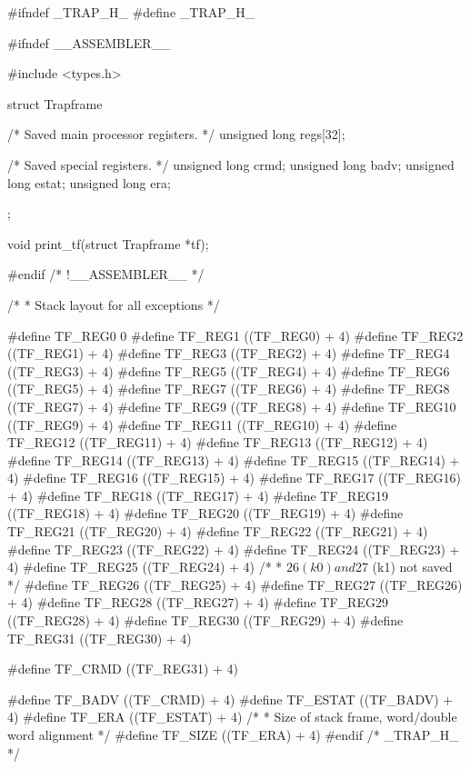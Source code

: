 \begin{CodeBlock}[language=BookC]
#ifndef _TRAP_H_
#define _TRAP_H_

#ifndef __ASSEMBLER__

#include <types.h>

struct Trapframe {
    /* Saved main processor registers. */
    unsigned long regs[32];

    /* Saved special registers. */
    unsigned long crmd;
    unsigned long badv;
    unsigned long estat;
    unsigned long era;
};

void print_tf(struct Trapframe *tf);

#endif /* !__ASSEMBLER__ */

/*
 * Stack layout for all exceptions
 */

#define TF_REG0 0
#define TF_REG1 ((TF_REG0) + 4)
#define TF_REG2 ((TF_REG1) + 4)
#define TF_REG3 ((TF_REG2) + 4)
#define TF_REG4 ((TF_REG3) + 4)
#define TF_REG5 ((TF_REG4) + 4)
#define TF_REG6 ((TF_REG5) + 4)
#define TF_REG7 ((TF_REG6) + 4)
#define TF_REG8 ((TF_REG7) + 4)
#define TF_REG9 ((TF_REG8) + 4)
#define TF_REG10 ((TF_REG9) + 4)
#define TF_REG11 ((TF_REG10) + 4)
#define TF_REG12 ((TF_REG11) + 4)
#define TF_REG13 ((TF_REG12) + 4)
#define TF_REG14 ((TF_REG13) + 4)
#define TF_REG15 ((TF_REG14) + 4)
#define TF_REG16 ((TF_REG15) + 4)
#define TF_REG17 ((TF_REG16) + 4)
#define TF_REG18 ((TF_REG17) + 4)
#define TF_REG19 ((TF_REG18) + 4)
#define TF_REG20 ((TF_REG19) + 4)
#define TF_REG21 ((TF_REG20) + 4)
#define TF_REG22 ((TF_REG21) + 4)
#define TF_REG23 ((TF_REG22) + 4)
#define TF_REG24 ((TF_REG23) + 4)
#define TF_REG25 ((TF_REG24) + 4)
/*
 * $26 (k0) and $27 (k1) not saved
 */
#define TF_REG26 ((TF_REG25) + 4)
#define TF_REG27 ((TF_REG26) + 4)
#define TF_REG28 ((TF_REG27) + 4)
#define TF_REG29 ((TF_REG28) + 4)
#define TF_REG30 ((TF_REG29) + 4)
#define TF_REG31 ((TF_REG30) + 4)

#define TF_CRMD ((TF_REG31) + 4)

#define TF_BADV ((TF_CRMD) + 4)
#define TF_ESTAT ((TF_BADV) + 4)
#define TF_ERA ((TF_ESTAT) + 4)
/*
 * Size of stack frame, word/double word alignment
 */
#define TF_SIZE ((TF_ERA) + 4)
#endif /* _TRAP_H_ */

\end{CodeBlock}

